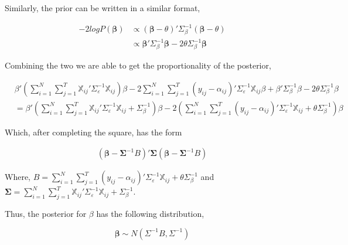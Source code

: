 \documentclass[
]{article}
\begin{document}
Similarly, the prior can be written in a similar format,

\begin{equation*}
\begin{aligned}
-2logP(\boldsymbol{\beta}) &\propto 
(\boldsymbol{\beta} - \theta)'\Sigma_{\beta}^{-1}(\boldsymbol{\beta} - \theta) \\
&\propto \boldsymbol{\beta}'\Sigma_{\beta}^{-1}\boldsymbol{\beta} - 2\theta\Sigma_{\beta}^{-1}\boldsymbol{\beta}
\end{aligned}
\end{equation*}

Combining the two we are able to get the proportionality of the posterior,

\begin{equation*}
\begin{aligned}
&\beta'(\sum^N_{i=1}\sum^T_{j=1}\boldsymbol{ \mathbb{X}}_{ij}'\Sigma_\varepsilon^{-1}\boldsymbol{ \mathbb{X}}_{ij})\beta -2\sum^N_{i=1}\sum^T_{j=1}(y_{ij} - \alpha_{ij})'\Sigma_\varepsilon^{-1}\boldsymbol{ \mathbb{X}}_{ij}\beta + \beta'\Sigma_{\beta}^{-1}\beta - 2\theta\Sigma_{\beta}^{-1}\beta \\
&= \beta'(\sum^N_{i=1}\sum^T_{j=1}\boldsymbol{ \mathbb{X}}_{ij}'\Sigma_\varepsilon^{-1}\boldsymbol{ \mathbb{X}}_{ij} + \Sigma_{\beta}^{-1})\beta -2(\sum^N_{i=1}\sum^T_{j=1}(y_{ij} - \alpha_{ij})'\Sigma_\varepsilon^{-1}\boldsymbol{ \mathbb{X}}_{ij} + \theta\Sigma_{\beta}^{-1}) \beta
\end{aligned}
\end{equation*}

Which, after completing the square, has the form

\begin{equation*}
\begin{aligned}
(\boldsymbol{\beta} - \boldsymbol{\Sigma}^{-1} B)'
\boldsymbol{\Sigma}
(\boldsymbol{\beta} - \boldsymbol{\Sigma}^{-1}B)
\end{aligned}
\end{equation*}

Where, \(B = \sum^N_{i=1}\sum^T_{j=1}(y_{ij} - \alpha_{ij})'\Sigma_\varepsilon^{-1}\boldsymbol{ \mathbb{X}}_{ij} + \theta\Sigma_{\beta}^{-1}\) and \(\boldsymbol{\Sigma} = \sum^N_{i=1}\sum^T_{j=1}\boldsymbol{ \mathbb{X}}_{ij}'\Sigma_\varepsilon^{-1}\boldsymbol{ \mathbb{X}}_{ij} + \Sigma_{\beta}^{-1}\).

Thus, the posterior for \(\beta\) has the following distribution,

\begin{equation*}
\boldsymbol{\beta}\sim N(\Sigma^{-1}B, \Sigma^{-1})
\end{equation*}
\end{document}
